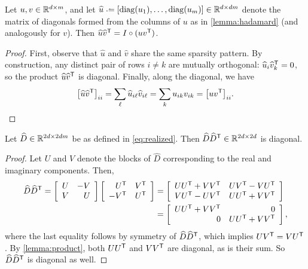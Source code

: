 \documentclass{article} %
\begin{document}
\begin{lemma}
Let ${u, v \in \mathbb{R}^{d\times m}}$, and let ${\widehat{u} \defeq
[\diag(u_1),\dots,\diag(u_m)] \in \R^{d\times dm}}$ denote the 
matrix of diagonals formed from the columns of $u$ as in \cref{lemma:hadamard} 
(and analogously for $v$).  Then ${\widehat{u}\widehat{v}^\mathsf{T} = I \circ (uv^\mathsf{T})}$.
\label{lemma:product}
\end{lemma}
\begin{proof}
First, observe that $\widehat{u}$ and $\widehat{v}$ share the same sparsity pattern.  
By construction, any distinct pair of rows $i \neq k$ are mutually orthogonal:
$\widehat{u}_i \widehat{v}_k^\mathsf{T} = 0$, so the product $\widehat{u}\widehat{v}^\mathsf{T}$ 
is diagonal.  Finally, along the diagonal, we have
\[
{\left[\widehat{u}\widehat{v}^\mathsf{T}\right]}_{ii} = \sum_\ell \widehat{u}_{i\ell}
\widehat{v}_{i\ell} = \sum_{k} u_{ik} v_{ik} = {\left[uv^\mathsf{T}\right]}_{ii}.
\]
\end{proof}

\begin{theorem}
Let $\widehat{D} \in \mathbb{R}^{2d\times 2dm}$ be as defined in \eqref{eq:realized}.  Then
$\widehat{D}\widehat{D}^\mathsf{T} \in \mathbb{R}^{2d\times 2d}$ is diagonal.\label{thm:diagonal}
\end{theorem}
\begin{proof}
Let $U$ and $V$ denote the blocks of $\widehat{D}$ corresponding to the
real and imaginary components.  Then,
\begin{align}
\widehat{D}\widehat{D}^\mathsf{T} = \left[\begin{array}{rr}U & -V\\ V & U\end{array}\right]
\left[\begin{array}{rr} U^\mathsf{T} & V^\mathsf{T}\\ -V^\mathsf{T} & U^\mathsf{T}\end{array}\right]
&= \left[\begin{array}{rr} UU^\mathsf{T} + VV^\mathsf{T} & UV^\mathsf{T} - VU^\mathsf{T} \\ VU^\mathsf{T} -
UV^\mathsf{T} & UU^\mathsf{T} + VV^\mathsf{T}\end{array} \right]\notag\\
&= \left[\begin{array}{rr}UU^\mathsf{T} + VV^\mathsf{T} & 0 \\ 0 & UU^\mathsf{T} + VV^\mathsf{T}\end{array}
\right],\label{eq:dictpower}
\end{align}
where the last equality follows by symmetry of $\widehat{D}\widehat{D}^\mathsf{T}$, which 
implies $UV^\mathsf{T} = VU^\mathsf{T}$.  By \cref{lemma:product}, both $UU^\mathsf{T}$ and $VV^\mathsf{T}$ 
are diagonal, as is their sum.  So $\widehat{D}\widehat{D}^\mathsf{T}$ is diagonal as well.
\end{proof}
\end{document}
